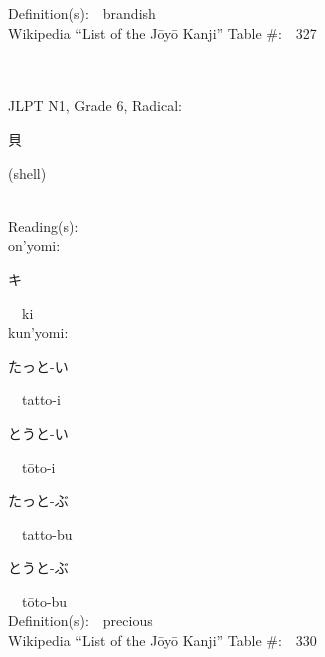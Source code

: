 \begin{multicols}{2}
Definition(s):\ \ brandish \\
Wikipedia ``List of the J\=oy\=o Kanji'' Table \#:\ \ 327 \\
\ \ \\
{\fontsize{34pt}{40pt}  }\ \ \\  %
{JLPT N1, Grade 6, Radical:\ \ {\begin{CJK}{UTF8}{min} 貝 \end{CJK}} (shell) } \\
Reading(s):\ \ \\
{\hspace*{1em}}on'yomi:\ \ \\
{\hspace*{2em}}{\begin{CJK}{UTF8}{min} キ \end{CJK}}\ \ ki\ \ \\
{\hspace*{1em}}kun'yomi:\ \ \\
{\hspace*{2em}}{\begin{CJK}{UTF8}{min} たっと-い \end{CJK}}\ \ tatto-i\ \ \\
{\hspace*{2em}}{\begin{CJK}{UTF8}{min} とうと-い \end{CJK}}\ \ t\=oto-i\ \ \\
{\hspace*{2em}}{\begin{CJK}{UTF8}{min} たっと-ぶ \end{CJK}}\ \ tatto-bu\ \ \\
{\hspace*{2em}}{\begin{CJK}{UTF8}{min} とうと-ぶ \end{CJK}}\ \ t\=oto-bu\ \ \\
Definition(s):\ \ precious \\
Wikipedia ``List of the J\=oy\=o Kanji'' Table \#:\ \ 330 \\
\ \ \\
{\fontsize{34pt}{40pt}  }\ \ \\  %

\end{multicols}
